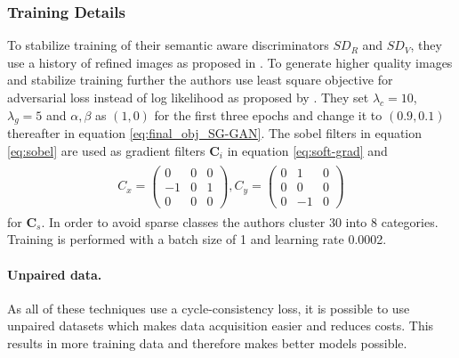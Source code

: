\subsubsection{Training Details}
To stabilize training of their semantic aware discriminators $SD_R$ and $SD_V$, they use a history of refined images as proposed in \cite{DBLP:journals/corr/ShrivastavaPTSW16}. To generate higher quality images and stabilize training further the authors use least square objective for adversarial loss instead of log likelihood as proposed by \cite{DBLP:journals/corr/MaoLXLW16}. They set $\lambda_c = 10$, $\lambda_g = 5$ and $\alpha, \beta$ as $(1,0)$ for the first three epochs and change it to $(0.9, 0.1)$ thereafter in equation \ref{eq:final_obj_SG-GAN}. The sobel filters in equation \ref{eq:sobel} are used as gradient filters $\mathbf{C}_i$ in equation \ref{eq:soft-grad} and 
\begin{align}
		\begin{array}{cc}
		C_x = 
		\begin{pmatrix}
			0 & 0 & 0\\
			-1 & 0 & 1\\
			0 & 0 & 0
		\end{pmatrix},
		C_y = 
		\begin{pmatrix}
			0 & 1 & 0\\
			0 & 0 & 0\\
			0 & -1 & 0
		\end{pmatrix}
	\end{array}
\end{align}
for $\mathbf{C}_s$. In order to avoid sparse classes the authors cluster 30 \cite{Cordts_2016_CVPR} into 8 categories. Training is performed with a batch size of 1 and learning rate 0.0002. 


\paragraph{Unpaired data.} As all of these techniques use a cycle-consistency loss, it is possible to use unpaired datasets which makes data acquisition easier and reduces costs. This results in more training data and therefore makes better models possible. 
